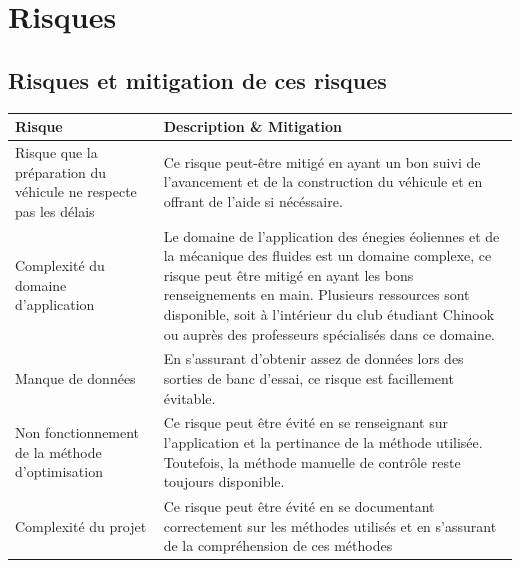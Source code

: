 \documentclass[11pt]{article}
\begin{document}
\section{Risques}

\subsection{Risques et mitigation de ces risques}

\begin{table}[H]
  \begin{center}
\begin{tabu} to \linewidth {X[1.5,l]|X[3,l]}
  \textbf{Risque} & \textbf{Description} \& \textbf{Mitigation} \\ \hline
  Risque que la préparation du véhicule ne respecte pas les délais & Ce risque peut-être mitigé en ayant un bon suivi de l'avancement et de la construction du véhicule et en offrant de l'aide si nécéssaire. \\ \hline
  Complexité du domaine d'application & Le domaine de l'application des énegies éoliennes et de la mécanique des fluides est un domaine complexe, ce risque peut être mitigé en ayant les bons renseignements en main. Plusieurs ressources sont disponible, soit à l'intérieur du club étudiant Chinook ou auprès des professeurs spécialisés dans ce domaine.\\ \hline
  Manque de données & En s'assurant d'obtenir assez de données lors des sorties de banc d'essai, ce risque est facillement évitable.\\ \hline
  Non fonctionnement de la méthode d'optimisation & Ce risque peut être évité en se renseignant sur l'application et la pertinance de la méthode utilisée. Toutefois, la méthode manuelle de contrôle reste toujours disponible.\\ \hline
  Complexité du projet & Ce risque peut être évité en se documentant correctement sur les méthodes utilisés et en s'assurant de la compréhension de ces méthodes \\
\end{tabu}
  \end{center}
\end{table}
\end{document}

